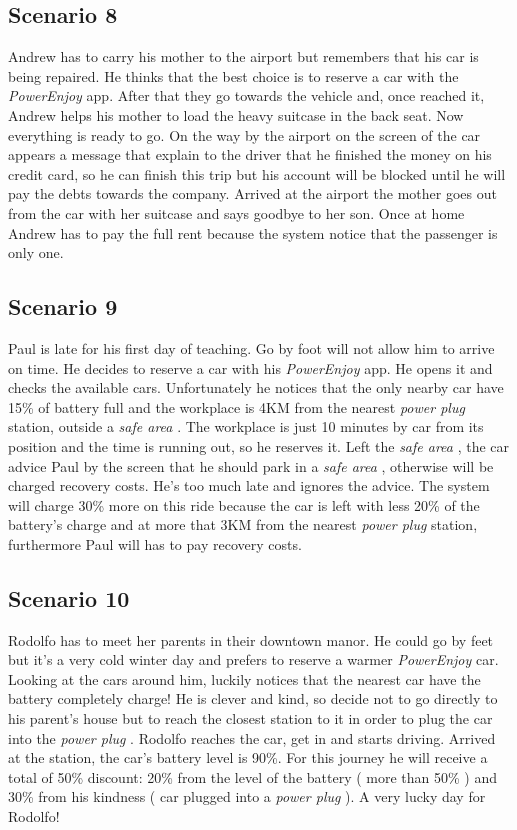 \documentclass[english]{article}
\newcommand{\powerenjoy}{\textit{PowerEnjoy }}
\newcommand{\safearea}{\textit{safe area }}
\newcommand{\powerplug}{\textit{power plug }}
\begin{document}
	\subsection{Scenario 8}
		Andrew has to carry his mother to the airport but remembers that his car is being repaired. He thinks that the best choice is to reserve a car with the \powerenjoy app. After that they go towards the vehicle and, once reached it, Andrew helps his mother to load the heavy suitcase in the back seat. Now everything is ready to go. On the way by the airport on the screen of the car appears a message that explain to the driver that he finished the money on his credit card, so he can finish this trip but his account will be blocked until he will pay the debts towards the company. Arrived at the airport the mother goes out from the car with her suitcase and says goodbye to her son. Once at home Andrew has to pay the full rent because the system notice that the passenger is only one.
	\subsection{Scenario 9}
		Paul is late for his first day of teaching. Go by foot will not allow him to arrive on time. He decides to reserve a car with his \powerenjoy app. He opens it and checks the available cars. Unfortunately he notices that the only nearby car have 15\% of battery full and the workplace is 4KM from the nearest \powerplug station, outside a \safearea. The workplace is just 10 minutes by car from its position and the time is running out, so 	he reserves it. Left the \safearea, the car advice Paul by the screen that he should 	park in a \safearea, otherwise will be charged recovery costs. He's too much late and ignores the advice. The system will charge 30\% more on this ride because the car is left with less 20\% of the battery's charge and at more that 3KM from the nearest \powerplug station, furthermore Paul will has to pay recovery costs.
	\subsection{Scenario 10}
		Rodolfo has to meet her parents in their downtown manor. He could go by feet but it's a very cold winter day and prefers to reserve a warmer \powerenjoy car. Looking at the cars around him, luckily notices that the nearest car have the battery completely charge! He is clever and kind, so decide not to go directly to his parent's house but to reach the closest station to it in order to plug the car into the \powerplug. Rodolfo reaches the car, get in and starts driving. Arrived at the station, the car's battery level is 90\%. For this journey he will receive a total of 50\% discount: 20\% from the level of the battery ( more than 50\% ) and 30\% from his kindness ( car plugged into a \powerplug ). A very lucky day for Rodolfo!
\end{document}
